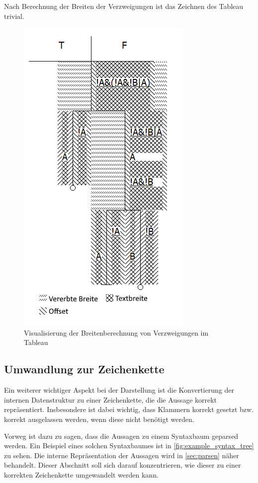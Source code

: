 Nach Berechnung der Breiten der Verzweigungen ist das Zeichnen des Tableau trivial.

\begin{figure}[H]
\begin{center}
\includegraphics[scale=1]{images/drawing_logic_calc_widths.png}
\caption{Visualisierung der Breitenberechnung von Verzweigungen im Tableau}
\label{fig:drawing_logic_calc_widths}
\end{center}
\end{figure}

\subsection{Umwandlung zur Zeichenkette}
Ein weiterer wichtiger Aspekt bei der Darstellung ist die Konvertierung der internen Datenstruktur zu einer Zeichenkette, die die Aussage korrekt repräsentiert. Insbesondere ist dabei wichtig, dass Klammern korrekt gesetzt bzw. korrekt ausgelassen werden, wenn diese nicht benötigt werden.

Vorweg ist dazu zu sagen, dass die Aussagen zu einem Syntaxbaum geparsed werden. Ein Beispiel eines solchen Syntaxbaumes ist in \autoref{fig:example_syntax_tree} zu sehen. Die interne Repräsentation der Aussagen wird in \autoref{sec:parsen} näher behandelt. Dieser Abschnitt soll sich darauf konzentrieren, wie dieser zu einer korrekten Zeichenkette umgewandelt werden kann.

